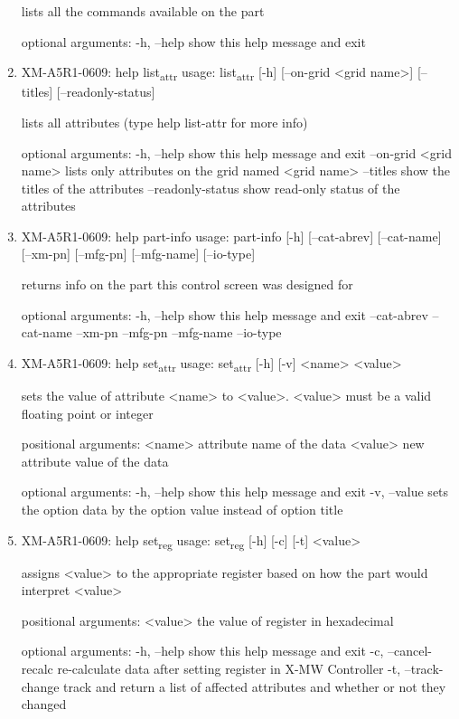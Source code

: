 \documentclass[11pt]{article}
\begin{document}
\begin{enumerate}
lists all the commands available on the part

optional arguments:
  -h, --help  show this help message and exit

\item XM-A5R1-0609: help list\textsubscript{attr}
\label{sec:org2813028}
usage: list\textsubscript{attr} [-h] [--on-grid <grid name>] [--titles] [--readonly-status]

lists all attributes (type help list-attr for more info)

optional arguments:
  -h, --help            show this help message and exit
  --on-grid <grid name>
                        lists only attributes on the grid named <grid name>
  --titles              show the titles of the attributes
  --readonly-status     show read-only status of the attributes

\item XM-A5R1-0609: help part-info
\label{sec:org06b74b8}
usage: part-info  [-h] [--cat-abrev] [--cat-name] [--xm-pn] [--mfg-pn] [--mfg-name]
        [--io-type]

returns info on the part this control screen was designed for

optional arguments:
  -h, --help   show this help message and exit
  --cat-abrev
  --cat-name
  --xm-pn
  --mfg-pn
  --mfg-name
  --io-type

\item XM-A5R1-0609: help set\textsubscript{attr}
\label{sec:org73c4808}
usage: set\textsubscript{attr} [-h] [-v] <name> <value>

sets the value of attribute <name> to <value>. <value> must be a valid
floating point or integer

positional arguments:
  <name>       attribute name of the data
  <value>      new attribute value of the data

optional arguments:
  -h, --help   show this help message and exit
  -v, --value  sets the option data by the option value instead of option
               title

\item XM-A5R1-0609: help set\textsubscript{reg}
\label{sec:orgf6c488d}
usage: set\textsubscript{reg} [-h] [-c] [-t] <value>

assigns <value> to the appropriate register based on how the part would
interpret <value>

positional arguments:
  <value>              the value of register in hexadecimal

optional arguments:
  -h, --help           show this help message and exit
  -c, --cancel-recalc  re-calculate data after setting register in X-MW
                       Controller
  -t, --track-change   track and return a list of affected attributes and
                       whether or not they changed


\end{enumerate}
\end{document}
